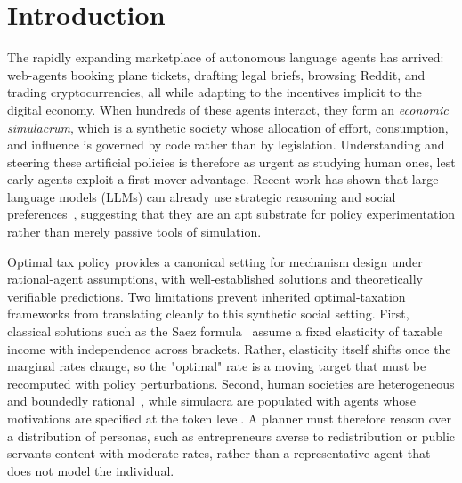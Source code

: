 \section{Introduction}
The rapidly expanding marketplace of autonomous language agents has arrived: web-agents booking plane tickets, drafting legal briefs, browsing Reddit, and trading cryptocurrencies, all while adapting to the incentives implicit to the digital economy. When hundreds of these agents interact, they form an \textit{economic simulacrum}, which is a synthetic society whose allocation of effort, consumption, and influence is governed by code rather than by legislation. Understanding and steering these artificial policies is therefore as urgent as studying human ones, lest early agents exploit a first-mover advantage. 
Recent work has shown that large language models (LLMs) can already use strategic reasoning and social preferences~\citep{zhang2024llm, park2024generative}, suggesting that they are an apt substrate for policy experimentation rather than merely passive tools of simulation.


Optimal tax policy provides a canonical setting for mechanism design under rational-agent assumptions, with well-established solutions and theoretically verifiable predictions.
Two limitations prevent inherited optimal-taxation frameworks from translating cleanly to this synthetic social setting. 
First, classical solutions such as the Saez formula~\citep{saez2001using,saez2016generalized} assume a fixed elasticity of taxable income with independence across brackets. Rather, elasticity itself shifts once the marginal rates change, so the "optimal" rate is a moving target that must be recomputed with policy perturbations.
Second, human societies are heterogeneous and boundedly rational~\citep{luce1959individual,mckelvey1995quantal}, while simulacra are populated with agents whose motivations are specified at the token level. A planner must therefore reason over a distribution of personas, such as entrepreneurs averse to redistribution or public servants content with moderate rates, rather than a representative agent that does not model the individual.

